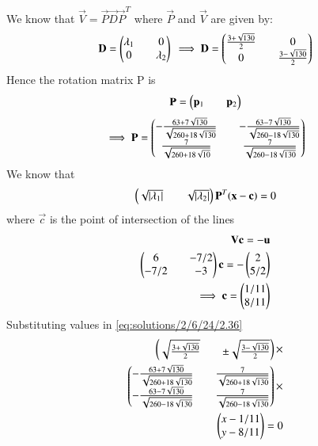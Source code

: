 We know that $\vec{V} = \vec{P}\vec{D}\vec{P}^T$ where $\vec{P}$ and $\vec{V}$ are given by:
\begin{equation}\label{eq:solutions/2/6/24/2.33}
\mathbf{D} = \begin{pmatrix}\lambda_1 && 0\\ 0 && \lambda_2\end{pmatrix}\\
\implies \mathbf{D} = \begin{pmatrix}\frac{3+\sqrt{130}}{2} && 0\\ 0 &&\frac{3-\sqrt{130}}{2} \end{pmatrix}
\end{equation}
Hence the rotation matrix P is
\begin{equation} \label{eq:solutions/2/6/24/2.34}
\mathbf{P} = \begin{pmatrix}\mathbf{p}_1 && \mathbf{p}_2\end{pmatrix}
\end{equation}
\begin{equation} \label{eq:solutions/2/6/24/2.35}
\implies \mathbf{P} = \begin{pmatrix}-\frac{63+7\sqrt{130}}{\sqrt{260+18\sqrt{130}}} && -\frac{63-7\sqrt{130}}{\sqrt{260-18\sqrt{130}}} \\ \frac{7}{\sqrt{260+18\sqrt{10}}} && \frac{7}{\sqrt{260-18\sqrt{130}}}\end{pmatrix}
\end{equation}
We know that 
\begin{equation}\label{eq:solutions/2/6/24/2.36}
\begin{pmatrix}\sqrt{|\lambda_1|} && \sqrt{|\lambda_2|}\end{pmatrix}\mathbf{P}^T(\mathbf{x}-\mathbf{c}) = 0
\end{equation}
where $\vec{c}$ is the point of intersection of the lines 
\begin{equation} \label{eq:solutions/2/6/24/2.37}
\begin{split}
\mathbf{V}\mathbf{c} = -\mathbf{u}\\
\begin{pmatrix}6 && -7/2\\-7/2 && -3\end{pmatrix} \mathbf{c} = -\begin{pmatrix}2 \\ 5/2\end{pmatrix}\\
\implies \mathbf{c} = \begin{pmatrix}1/11 \\ 8/11\end{pmatrix}
\end{split}
\end{equation}
Substituting values in \eqref{eq:solutions/2/6/24/2.36}
\begin{equation} \label{eq:solutions/2/6/24/2.38}
\begin{split}
\begin{pmatrix} \sqrt{\frac{3+\sqrt{130}}{2}} && \pm\sqrt{\frac{3-\sqrt{130}}{2}}\end{pmatrix} \times \\
\begin{pmatrix} -\frac{63+7\sqrt{130}}{\sqrt{260+18\sqrt{130}}} && \frac{7}{\sqrt{260+18\sqrt{130}}} \\ -\frac{63-7\sqrt{130}}{\sqrt{260-18\sqrt{130}}} && \frac{7}{\sqrt{260-18\sqrt{130}}}\end{pmatrix} \times \\
\begin{pmatrix}x-1/11 \\ y-8/11\end{pmatrix} = 0
\end{split}
\end{equation}
